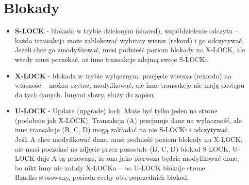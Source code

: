 \documentclass[a4paper,twoside]{article}
\begin{document}
  	\section*{Blokady}				
  	\begin{itemize}
  		\item \textbf{S-LOCK} - blokada w trybie dzielonym (shared), współdzielenie odczytu – każda transakcja może zablokować wybrany wiersz (rekord) i go odczytywać, Jeżeli chce go zmodyfikować, musi podnieść poziom blokady na X-LOCK, ale wtedy musi poczekać, aż inne transakcje zdejmą swoje S-LOCKi.
  		\item \textbf{X-LOCK} - blokada w trybie wyłącznym, przejęcie wiersza (rekordu) na własność – można czytać, modyfikować, ale inne transakcje nie mają dostępu do tych danych. Innymi słowy, służy do zapisu.
  		\item \textbf{U-LOCK} - Update (upgrade) lock. Może być tylko jeden na strone (podobnie jak X-LOCK). Transakcja (A) przejmuje dane na wyłączność, ale inne transakcje (B, C, D) mogą zakładać na nie S-LOCKi i odczytywać. \\ Jeśli A chce modyfikować dane, musi podnieść poziom blokady na X-LOCK, ale musi poczekać na zdjęcie przez pozostałe (B, C, D) blokad S-LOCK. U-LOCK daje A tą przewagę, że ona jako pierwsza będzie modyfikować dane, bo nikt inny nie założy X-LOCKa – bo U-LOCK blokuje strone. \\ Rzadko stosowany, posiada cechy obu poprzednich blokad.
  	\end{itemize}
  	
\end{document}
